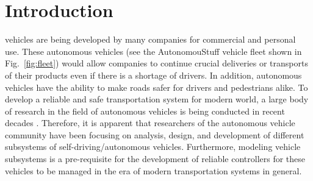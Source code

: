 \documentclass[journal,twoside,web]{ieeecolor}
\begin{document}
\section{Introduction}
\label{sec:introduction}
 vehicles are being developed by many companies for commercial and
personal use. These autonomous vehicles (see the AutonomouStuff vehicle fleet
shown in Fig.~\ref{fig:fleet}) would allow companies to continue crucial deliveries
or transports of their products even if there is a shortage of drivers. In
addition, autonomous vehicles have the ability to make roads safer for drivers
and pedestrians alike. To develop a reliable and safe transportation system for
modern world, a large body of research in the field of autonomous vehicles is
being conducted in recent decades \cite{Liu2017} \cite{Prasad2020}.
Therefore, it is apparent that researchers of the autonomous vehicle community
have been focusing on analysis, design, and development of different subsystems
of self-driving/autonomous vehicles. Furthermore, modeling vehicle subsystems is
a pre-requisite for the development of reliable controllers for these vehicles
to be managed in the era of modern transportation systems in general.

\end{document}
